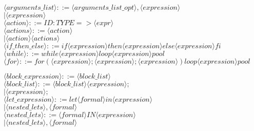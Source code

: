 \documentclass[11pt]{article}
\begin{document}
\begin{enumerate}
$\langle arguments\_list\rangle          ::= \langle arguments\_list\_opt\rangle , \langle expression\rangle$\\
                          \hspace*{4.1cm}$|   \langle expression\rangle$\\


$\langle action\rangle                  ::= ID : TYPE => \langle expr\rangle$\\

$\langle actions\rangle                 ::= \langle action\rangle$\\
                          \hspace*{2.7cm}$|   \langle action\rangle \langle actions\rangle$\\

$\langle if\_then\_else\rangle            ::= if \langle expression\rangle then \langle expression\rangle else \langle expression\rangle fi$\\

$\langle while\rangle                   ::= while \langle expression\rangle loop \langle expression\rangle pool$\\
\color{blue}
$\langle for\rangle                   ::= for ( \langle expression\rangle ; \langle expression\rangle ; \langle expression\rangle ) loop \langle expression\rangle pool$\\
\color{black}

$\langle block\_expression \rangle        ::= { \langle block\_list\rangle }$\\

$\langle block\_list\rangle              ::= \langle block\_list\rangle \langle expression\rangle ;$\\
                          \hspace*{3.2cm}$|   \langle expression\rangle ;$\\
    
$\langle let\_expression\rangle          ::= let \langle formal\rangle in \langle expression\rangle$\\
                          \hspace*{3.8cm}$|   \langle nested\_lets\rangle , \langle formal\rangle$\\

$\langle nested\_lets\rangle            ::= \langle formal\rangle IN \langle expression\rangle$\\
                          \hspace*{3.2cm}$|   \langle nested\_lets\rangle , \langle formal\rangle$\\


\end{enumerate}
\end{document}
